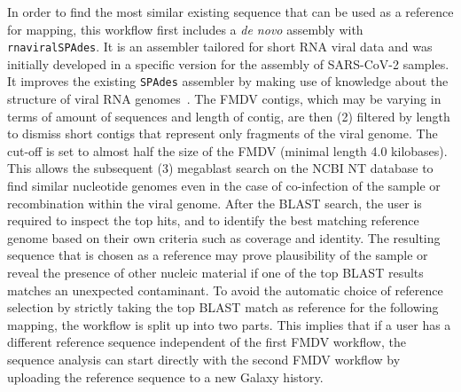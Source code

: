 In order to find the most similar existing sequence that can be used as a reference for mapping, this workflow first includes a \textit{de novo} assembly with \texttt{rnaviralSPAdes}. It is an assembler tailored for short \ac{RNA} viral data and was initially developed in a specific version for the assembly of \ac{SARS-CoV-2} samples. It improves the existing \texttt{SPAdes} assembler by making use of knowledge about the structure of viral \ac{RNA} genomes~\cite{meleshko2022coronaspades}. The \ac{FMDV} contigs, which may be varying in terms of amount of sequences and length of contig, are then (2) filtered by length to dismiss short contigs that represent only fragments of the viral genome. The cut-off is set to almost half the size of the \ac{FMDV} (minimal length 4.0 kilobases). This allows the subsequent (3) megablast search on the \ac{NCBI} NT database to find similar nucleotide genomes even in the case of co-infection of the sample or recombination within the viral genome. After the \ac{BLAST} search, the user is required to inspect the top hits, and to identify the best matching reference genome based on their own criteria such as coverage and identity. The resulting sequence that is chosen as a reference may prove plausibility of the sample or reveal the presence of other nucleic material if one of the top \ac{BLAST} results matches an unexpected contaminant. To avoid the automatic choice of reference selection by strictly taking the top \ac{BLAST} match as reference for the following mapping, the workflow is split up into two parts. This implies that if a user has a different reference sequence independent of the first \ac{FMDV} workflow, the sequence analysis can start directly with the second \ac{FMDV} workflow by uploading the reference sequence to a new Galaxy history.

